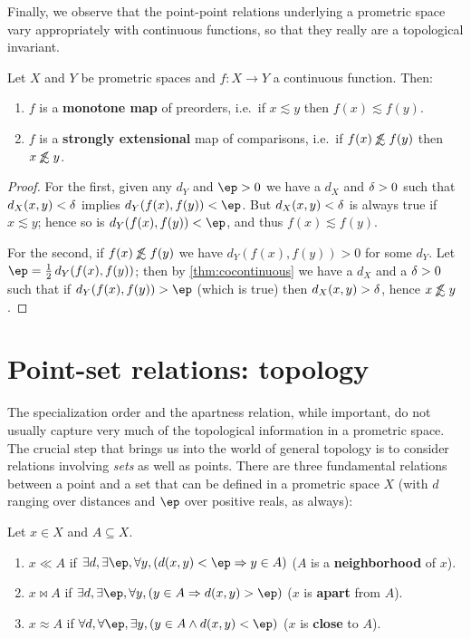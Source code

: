 \documentclass{article}
\def\oapt{\mathrel{\!\not\,\not\lesssim}}
\def\leapx{\lesssim}
\let\implies\Rightarrow
\begin{document}
Finally, we observe that the point-point relations underlying a prometric space vary appropriately with continuous functions, so that they really are a topological invariant.

\begin{thm}
  Let $X$ and $Y$ be prometric spaces and $f:X\to Y$ a continuous function.
  Then:
  \begin{enumerate}
  \item $f$ is a \textbf{monotone map} of preorders, i.e.\ if $x\leapx y$ then $f(x)\leapx f(y)$.
  \item $f$ is a \textbf{strongly extensional} map of comparisons, i.e.\ if $f(x)\oapt f(y)$ then $x\oapt y$.
  \end{enumerate}
\end{thm}
\begin{proof}
  For the first, given any $d_Y$ and $\ep>0$ we have a $d_X$ and $\delta>0$ such that $d_X(x,y)<\delta$ implies $d_Y(f(x),f(y))<\ep$.
  But $d_X(x,y)<\delta$ is always true if $x\leapx y$; hence so is $d_Y(f(x),f(y))<\ep$, and thus $f(x)\leapx f(y)$.

  For the second, if $f(x)\oapt f(y)$ we have $d_Y(f(x),f(y))>0$ for some $d_Y$.
  Let $\ep = \frac12 \,d_Y(f(x),f(y))$; then by \cref{thm:cocontinuous} we have a $d_X$ and a $\delta>0$ such that if $d_Y(f(x),f(y))>\ep$ (which is true) then $d_X(x,y)>\delta$, hence $x\oapt y$.
\end{proof}


\section{Point-set relations: topology}
\label{sec:point-set}
\label{sec:topology}

The specialization order and the apartness relation, while important, do not usually capture very much of the topological information in a prometric space.
The crucial step that brings us into the world of general topology is to consider relations involving \emph{sets} as well as points.
There are three fundamental relations between a point and a set that can be defined in a prometric space $X$ (with $d$ ranging over distances and $\ep$ over positive reals, as always):

\begin{defn}\label{defn:toprels}
  Let $x\in X$ and $A\subseteq X$.
  \begin{enumerate}
  \item $x\ll A$ if $\exists d, \exists \ep, \forall y, (d(x,y)<\ep \implies y\in A)$ ($A$ is a \textbf{neighborhood} of $x$).
  \item $x\bowtie A$ if $\exists d, \exists \ep, \forall y, (y\in A \implies d(x,y)>\ep)$ ($x$ is \textbf{apart} from $A$).
  \item $x\approx A$ if $\forall d, \forall \ep, \exists y, (y\in A \land d(x,y)<\ep)$ ($x$ is \textbf{close} to $A$).
  \end{enumerate}
\end{defn}
\end{document}
